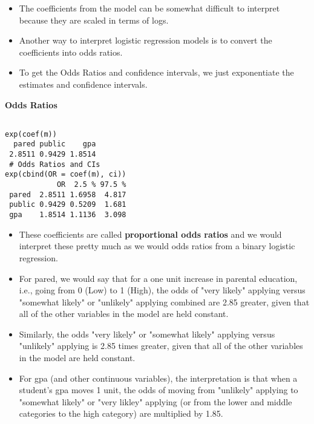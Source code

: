 \documentclass[00-GLMregslides.tex]{subfiles}
\begin{document}
\begin{frame}

\begin{itemize}
\item  The coefficients from the model can be somewhat difficult to interpret because they are scaled in terms of logs. 
\item Another way to interpret logistic regression models is to convert the coefficients into odds ratios. 
\item To get the Odds Ratios and confidence intervals, we just exponentiate the estimates and confidence intervals.
\end{itemize}
\end{frame}
\begin{frame}[fragile]
\textbf{Odds Ratios}
	\begin{verbatim}

exp(coef(m))
  pared public    gpa 
 2.8511 0.9429 1.8514
 # Odds Ratios and CIs
exp(cbind(OR = coef(m), ci))
            OR  2.5 % 97.5 %
 pared  2.8511 1.6958  4.817
 public 0.9429 0.5209  1.681
 gpa    1.8514 1.1136  3.098
\end{verbatim}
\end{frame}
\begin{frame}
\begin{itemize}
\item These coefficients are called \textbf{proportional odds ratios} and we would interpret these pretty much as 
we would odds ratios from a binary logistic regression. 
\item For pared, we would say that for a one unit increase in parental education, i.e., going from 0 (Low) to 1 (High), 
the odds of "very likely" applying versus "somewhat likely" or "unlikely" applying combined are 2.85 greater, 
given that all of the other variables in the model are held constant. 
\end{itemize}
\end{frame}
\begin{frame}
\begin{itemize}
\item Similarly, the odds "very likely" or "somewhat likely" applying versus "unlikely" applying is 2.85 times greater, 
given that all of the other variables in the model are held constant.
\item For gpa (and other continuous variables), the interpretation is that when a student's gpa moves 1 unit, 
the odds of moving from "unlikely" applying to "somewhat likely" or "very likley" applying (or from the lower and middle categories to the high category) are multiplied by 1.85.
\end{itemize}
\end{frame}
\end{document}

